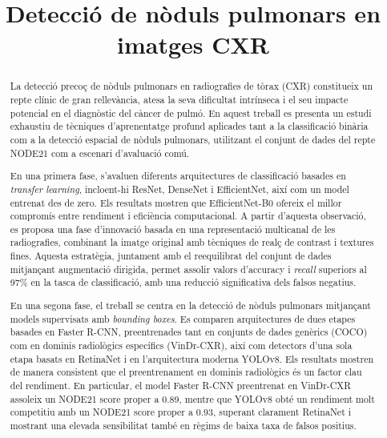 \documentclass[conference]{IEEEtran}
\begin{document}
\title{\LARGE Detecció de nòduls pulmonars en imatges CXR}

\author{
}

\maketitle


\begin{abstract}
La detecció precoç de nòduls pulmonars en radiografies de tòrax (CXR) constitueix
un repte clínic de gran rellevància, atesa la seva dificultat intrínseca i el seu
impacte potencial en el diagnòstic del càncer de pulmó. En aquest treball es presenta
un estudi exhaustiu de tècniques d’aprenentatge profund aplicades tant a la
classificació binària com a la detecció espacial de nòduls pulmonars, utilitzant el
conjunt de dades del repte NODE21 com a escenari d’avaluació comú.

En una primera fase, s’avaluen diferents arquitectures de classificació basades en
\textit{transfer learning}, incloent-hi ResNet, DenseNet i EfficientNet, així com un
model entrenat des de zero. Els resultats mostren que EfficientNet-B0 ofereix el millor
compromís entre rendiment i eficiència computacional. A partir d’aquesta observació,
es proposa una fase d’innovació basada en una representació multicanal de les
radiografies, combinant la imatge original amb tècniques de realç de contrast i
textures fines. Aquesta estratègia, juntament amb el reequilibrat del conjunt de
dades mitjançant augmentació dirigida, permet assolir valors d’accuracy i
\textit{recall} superiors al 97\% en la tasca de classificació, amb una reducció
significativa dels falsos negatius.

En una segona fase, el treball se centra en la detecció de nòduls pulmonars mitjançant
models supervisats amb \textit{bounding boxes}. Es comparen arquitectures de dues
etapes basades en Faster R-CNN, preentrenades tant en conjunts de dades genèrics
(COCO) com en dominis radiològics específics (VinDr-CXR), així com detectors d’una
sola etapa basats en RetinaNet i en l’arquitectura moderna YOLOv8. Els resultats
mostren de manera consistent que el preentrenament en dominis radiològics és un
factor clau del rendiment. En particular, el model Faster R-CNN preentrenat en
VinDr-CXR assoleix un NODE21 score proper a 0.89, mentre que YOLOv8 obté un
rendiment molt competitiu amb un NODE21 score proper a 0.93, superant clarament
RetinaNet i mostrant una elevada sensibilitat també en règims de baixa taxa de
falsos positius.


\end{abstract}
\end{document}
